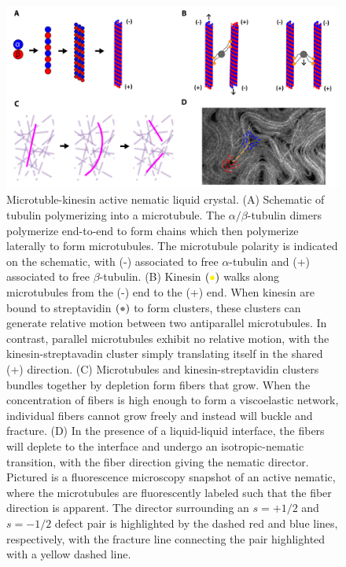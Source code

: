 \begin{figure}
  \centering
  \includegraphics{figures/C3/Ch3-Figs_ActiveBuild.png}
  \caption{Microtuble-kinesin active nematic liquid crystal.
  (A) Schematic of tubulin polymerizing into a microtubule. The $\alpha/\beta$-tubulin dimers polymerize end-to-end to form chains which then polymerize laterally to form microtubules.
  The microtubule polarity is indicated on the schematic, with (-) associated to free $\alpha$-tubulin and (+) associated to free $\beta$-tubulin.
  (B) Kinesin $({\color{yellow} \bullet})$ walks along microtubules from the (-) end to the (+) end.
  When kinesin are bound to streptavidin $({\color{gray} \bullet})$ to form clusters, these clusters can generate relative motion between two antiparallel microtubules.
  In contrast, parallel microtubules exhibit no relative motion, with the kinesin-streptavadin cluster simply translating itself in the shared (+) direction.
  (C) Microtubules and kinesin-streptavidin clusters bundles together by depletion form fibers that grow.
  When the concentration of fibers is high enough to form a viscoelastic network, individual fibers cannot grow freely and instead will buckle and fracture.
  (D) In the presence of a liquid-liquid interface, the fibers will deplete to the interface and undergo an isotropic-nematic transition, with the fiber direction giving the nematic director.
  Pictured is a fluorescence microscopy snapshot of an active nematic, where the microtubules are fluorescently labeled such that the fiber direction is apparent.
  The director surrounding an $s = + 1/2$ and $s = -1/2$ defect pair is highlighted by the dashed red and blue lines, respectively, with the fracture line connecting the pair highlighted with a yellow dashed line.}\label{f:3-ActiveBuild}
\end{figure}

